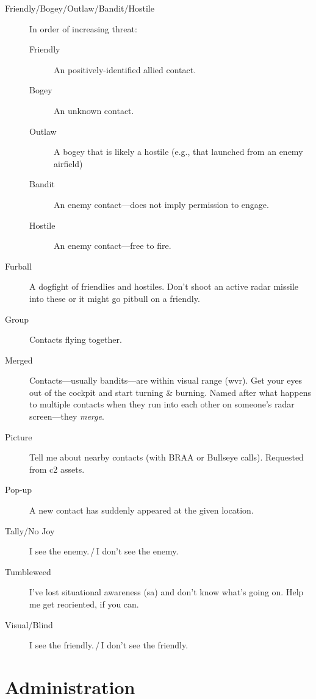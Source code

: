 \begin{description}
\item[Friendly/Bogey/Outlaw/Bandit/Hostile]
    In order of increasing threat:
    \begin{description}
    \item[Friendly] An positively-identified allied contact.
    \item[Bogey] An unknown contact.
    \item[Outlaw] A bogey that is likely a hostile
        (e.g., that launched from an enemy airfield)
    \item[Bandit] An enemy contact---does not imply permission to engage.
    \item[Hostile] An enemy contact---free to fire.
    \end{description}

\item[Furball] A dogfight of friendlies and hostiles.
    Don't shoot an active radar missile into these or it might go pitbull
    on a friendly.

\item[Group] Contacts flying together.

\item[Merged] Contacts---usually bandits---are within visual range
    \ac{(wvr)}.
    Get your eyes out of the cockpit and start turning \& burning.
    Named after what happens to multiple contacts when they run into each other
    on someone's radar screen---they \emph{merge}.

\item[Picture] Tell me about nearby contacts (with BRAA or Bullseye calls).
    Requested from \ac{c2} assets.

\item[Pop-up] A new contact has suddenly appeared at the given location.

\item[Tally/No Joy] I see the enemy.\,/\,I don't see the enemy.

\item[Tumbleweed] I've lost situational awareness \ac{(sa)}
    and don't know what's going on.
    Help me get reoriented, if you can.

\item[Visual/Blind] I see the friendly.\,/\,I don't see the friendly.
\end{description}

\section{Administration}

